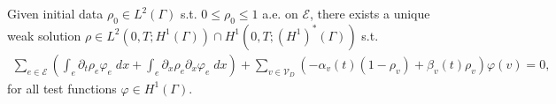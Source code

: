 \begin{theorem} 
    Given initial data $\rho_0 \in L^2(\Gamma)$ s.t. $0 \le \rho_0 \le 1$ a.e. on $\mathcal{E}$, there exists a unique weak solution $\rho \in L^2(0,T; H^1(\Gamma)) \cap H^1(0,T; (H^1)^*(\Gamma))$ s.t.
	\begin{align*}
		\sum_{e \in \mathcal{E}} \left(\int_e  \partial_t \rho_e \varphi_e \;dx + \int_e \partial_x \rho_e\partial_x \varphi_e \;dx\right) + \sum_{v \in \mathcal{V}_D} (-\alpha_v(t) (1-\rho_v) + \beta_v(t) \rho_v)\varphi(v) = 0,
	\end{align*}
	for all test functions $\varphi \in H^1(\Gamma)$.
\end{theorem}


